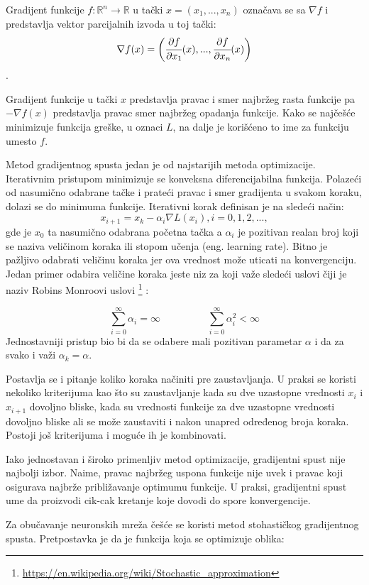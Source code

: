Gradijent funkcije $f:\mathbb{R}^n \rightarrow \mathbb{R}$ u tački $x=(x_1, ..., x_n)$ označava se sa $\nabla f$ i predstavlja vektor parcijalnih izvoda u toj tački:
\begin{equation}
\nabla f(x) = \bigg( \cfrac{\partial f}{\partial x_1}(x),...,\cfrac{\partial f}{\partial x_n}(x) \bigg)
\end{equation}.

Gradijent funkcije u tački $x$ predstavlja pravac i smer najbržeg rasta funkcije pa $- \nabla f(x)$ predstavlja pravac smer najbržeg opadanja funkcije. Kako se najčešće minimizuje funkcija greške, u oznaci $L$, na dalje je korišćeno to ime za funkciju umesto $f$.
\par

Metod gradijentnog spusta jedan je od najstarijih metoda  optimizacije. Iterativnim pristupom minimizuje se konveksna diferencijabilna funkcija. Polazeći od nasumično odabrane tačke i prateći pravac i smer gradijenta u svakom koraku, dolazi se do minimuma funkcije. Iterativni korak definisan je na sledeći način:
\begin{equation}
	\label{eq:gradijentni_spust}
	x_{i+1} = x_k - \alpha_i \nabla L(x_i), i=0, 1, 2, ... ,
\end{equation}
gde je $x_0$ ta nasumično odabrana početna tačka a $\alpha_i$ je pozitivan realan broj koji se naziva veličinom koraka ili stopom učenja (eng. learning rate). Bitno je pažljivo odabrati veličinu koraka jer ova vrednost može uticati na konvergenciju. Jedan primer odabira veličine koraka jeste niz za koji važe sledeći uslovi čiji je naziv Robins Monroovi uslovi \footnote{\url{https://en.wikipedia.org/wiki/Stochastic_approximation}} :

\begin{equation}
	 \sum_{i=0}^{\infty} \alpha_i = \infty \hspace{2cm} \sum_{i=0}^{\infty} \alpha_i^2 < \infty 
	\end{equation}
Jednostavniji pristup bio bi da se odabere mali pozitivan parametar $\alpha$ i da za svako i važi $\alpha_k = \alpha$.
\par
Postavlja se i pitanje koliko koraka načiniti pre zaustavljanja. U praksi se koristi nekoliko kriterijuma kao što su zaustavljanje kada su dve uzastopne vrednosti $x_i$ i $x_{i+1}$ dovoljno bliske, kada su vrednosti funkcije za dve uzastopne vrednosti dovoljno bliske ali se može zaustaviti i nakon unapred određenog broja koraka. Postoji još kriterijuma i moguće ih je kombinovati.
\par
Iako jednostavan i široko primenljiv metod optimizacije, gradijentni spust nije najbolji izbor. Naime, pravac najbržeg uspona funkcije nije uvek i pravac koji osigurava najbrže približavanje optimumu funkcije. U praksi, gradijentni spust ume da proizvodi cik-cak kretanje koje dovodi do spore konvergencije.
\par
Za obučavanje neuronskih mreža češće se koristi metod stohastičkog gradijentnog spusta. Pretpostavka je da je funkcija koja se optimizuje oblika:

